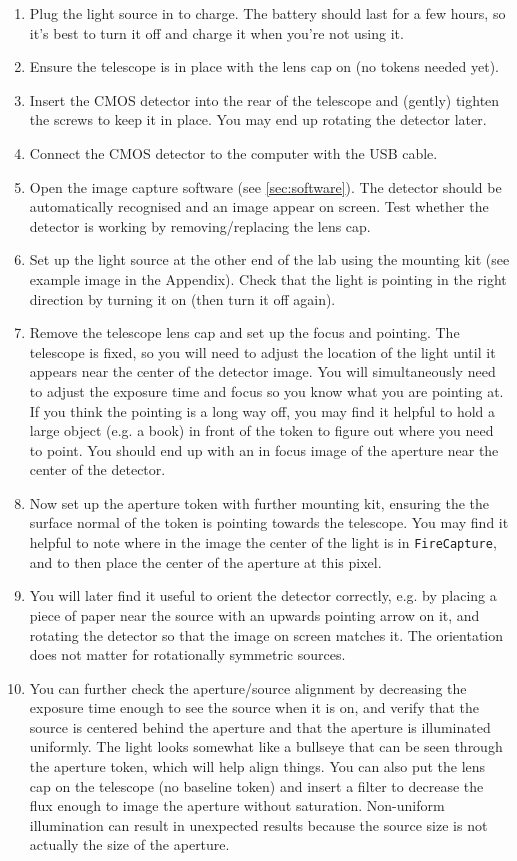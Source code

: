 \documentclass[11pt]{article}
\begin{document}
\begin{enumerate}
    \item Plug the light source in to charge. The battery should last for a few hours, so it's best to turn it off and charge it when you're not using it.
    \item Ensure the telescope is in place with the lens cap on (no tokens needed yet).
    \item Insert the CMOS detector into the rear of the telescope and (gently) tighten the screws to keep it in place. You may end up rotating the detector later.
    \item Connect the CMOS detector to the computer with the USB cable.
    \item Open the image capture software (see \ref{sec:software}). The detector should be automatically recognised and an image appear on screen. Test whether the detector is working by removing/replacing the lens cap.
    \item Set up the light source at the other end of the lab using the mounting kit (see example image in the Appendix). Check that the light is pointing in the right direction by turning it on (then turn it off again).
    \item Remove the telescope lens cap and set up the focus and pointing. The telescope is fixed, so you will need to adjust the location of the light until it appears near the center of the detector image. You will simultaneously need to adjust the exposure time and focus so you know what you are pointing at. If you think the pointing is a long way off, you may find it helpful to hold a large object (e.g. a book) in front of the token to figure out where you need to point. You should end up with an in focus image of the aperture near the center of the detector.
    \item Now set up the aperture token with further mounting kit, ensuring the the surface normal of the token is pointing towards the telescope. You may find it helpful to note where in the image the center of the light is in \texttt{FireCapture}, and to then place the center of the aperture at this pixel.
    \item You will later find it useful to orient the detector correctly, e.g. by placing a piece of paper near the source with an upwards pointing arrow on it, and rotating the detector so that the image on screen matches it. The orientation does not matter for rotationally symmetric sources.
    \item You can further check the aperture/source alignment by decreasing the exposure time enough to see the source when it is on, and verify that the source is centered behind the aperture and that the aperture is illuminated uniformly. The light looks somewhat like a bullseye that can be seen through the aperture token, which will help align things. You can also put the lens cap on the telescope (no baseline token) and insert a filter to decrease the flux enough to image the aperture without saturation. Non-uniform illumination can result in unexpected results because the source size is not actually the size of the aperture.

\end{enumerate}
\end{document}
